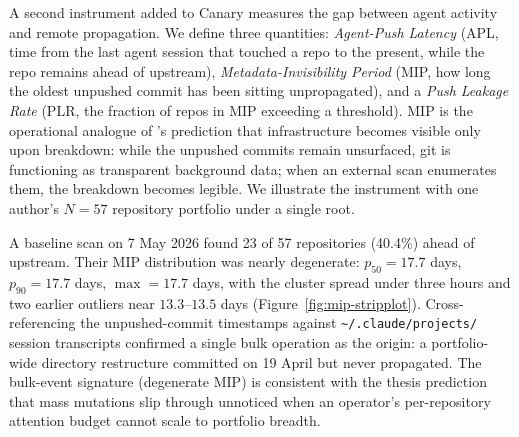 \documentclass[sigconf, nonacm, anonymous=false]{acmart}
\begin{document}
\label{sec:instrument}A second instrument added to Canary measures the gap between agent activity and remote propagation. We define three quantities: \textit{Agent-Push Latency} (APL, time from the last agent session that touched a repo to the present, while the repo remains ahead of upstream), \textit{Metadata-Invisibility Period} (MIP, how long the oldest unpushed commit has been sitting unpropagated), and a \textit{Push Leakage Rate} (PLR, the fraction of repos in MIP exceeding a threshold). MIP is the operational analogue of \citet{star1996steps}'s prediction that infrastructure becomes visible only upon breakdown: while the unpushed commits remain unsurfaced, git is functioning as transparent background data; when an external scan enumerates them, the breakdown becomes legible. We illustrate the instrument with one author's $N=57$ repository portfolio under a single root.

A baseline scan on 7 May 2026 found 23 of 57 repositories (40.4\%) ahead of upstream. Their MIP distribution was nearly degenerate: $p_{50}=17.7$ days, $p_{90}=17.7$ days, $\max=17.7$ days, with the cluster spread under three hours and two earlier outliers near $13.3$--$13.5$ days (Figure~\ref{fig:mip-stripplot}). Cross-referencing the unpushed-commit timestamps against \texttt{\textasciitilde/.claude/projects/} session transcripts confirmed a single bulk operation as the origin: a portfolio-wide directory restructure committed on 19 April but never propagated. The bulk-event signature (degenerate MIP) is consistent with the thesis prediction that mass mutations slip through unnoticed when an operator's per-repository attention budget cannot scale to portfolio breadth.
\end{document}
